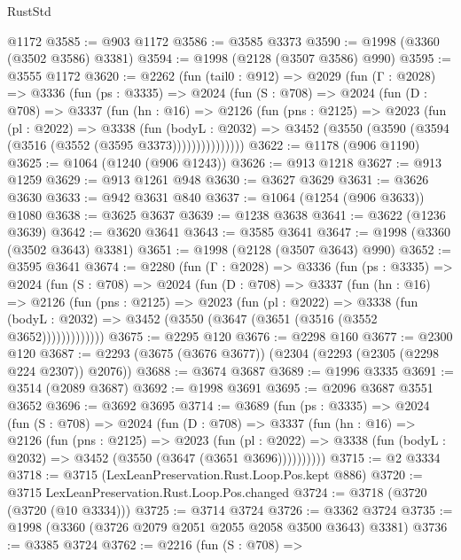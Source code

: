 \begin{lexlean}{RustStd}
\begin{coremodule}
    @1172
@3585 := @903 @1172
@3586 := @3585 @3373
@3590 := @1998 (@3360 (@3502 @3586) @3381)
@3594 := @1998 (@2128 (@3507 @3586) @990)
@3595 := @3555 @1172
@3620 := @2262
    (fun (tail0 : @912) =>
    @2029
      (fun (Γ : @2028) =>
      @3336
        (fun (ps : @3335) =>
        @2024
          (fun (S : @708) =>
          @2024
            (fun (D : @708) =>
            @3337
              (fun (hn : @16) =>
              @2126
                (fun (pns : @2125) =>
                @2023
                  (fun (pl : @2022) =>
                  @3338
                    (fun (bodyL : @2032) =>
                    @3452 (@3550 (@3590 (@3594 (@3516 (@3552 (@3595 @3373)))))))))))))))
@3622 := @1178 (@906 @1190)
@3625 := @1064 (@1240 (@906 @1243))
@3626 := @913 @1218
@3627 := @913 @1259
@3629 := @913 @1261 @948
@3630 := @3627 @3629
@3631 := @3626 @3630
@3633 := @942 @3631 @840
@3637 := @1064 (@1254 (@906 @3633)) @1080
@3638 := @3625 @3637
@3639 := @1238 @3638
@3641 := @3622 (@1236 @3639)
@3642 := @3620 @3641
@3643 := @3585 @3641
@3647 := @1998 (@3360 (@3502 @3643) @3381)
@3651 := @1998 (@2128 (@3507 @3643) @990)
@3652 := @3595 @3641
@3674 := @2280
    (fun (Γ : @2028) =>
    @3336
      (fun (ps : @3335) =>
      @2024
        (fun (S : @708) =>
        @2024
          (fun (D : @708) =>
          @3337
            (fun (hn : @16) =>
            @2126
              (fun (pns : @2125) =>
              @2023
                (fun (pl : @2022) =>
                @3338
                  (fun (bodyL : @2032) =>
                  @3452 (@3550 (@3647 (@3651 (@3516 (@3552 @3652)))))))))))))
@3675 := @2295 @120
@3676 := @2298 @160
@3677 := @2300 @120
@3687 := @2293 (@3675 (@3676 @3677)) (@2304 (@2293 (@2305 (@2298 @224 @2307)) @2076))
@3688 := @3674 @3687
@3689 := @1996 @3335
@3691 := @3514 (@2089 @3687)
@3692 := @1998 @3691
@3695 := @2096 @3687 @3551 @3652
@3696 := @3692 @3695
@3714 := @3689
    (fun (ps : @3335) =>
    @2024
      (fun (S : @708) =>
      @2024
        (fun (D : @708) =>
        @3337
          (fun (hn : @16) =>
          @2126
            (fun (pns : @2125) =>
            @2023
              (fun (pl : @2022) =>
              @3338 (fun (bodyL : @2032) => @3452 (@3550 (@3647 (@3651 @3696))))))))))
@3715 := @2 @3334
@3718 := @3715 (LexLeanPreservation.Rust.Loop.Pos.kept @886)
@3720 := @3715 LexLeanPreservation.Rust.Loop.Pos.changed
@3724 := @3718 (@3720 (@3720 (@10 @3334)))
@3725 := @3714 @3724
@3726 := @3362 @3724
@3735 := @1998 (@3360 (@3726 @2079 @2051 @2055 @2058 @3500 @3643) @3381)
@3736 := @3385 @3724
@3762 := @2216
    (fun (S : @708) =>

\end{coremodule}
\end{lexlean}
